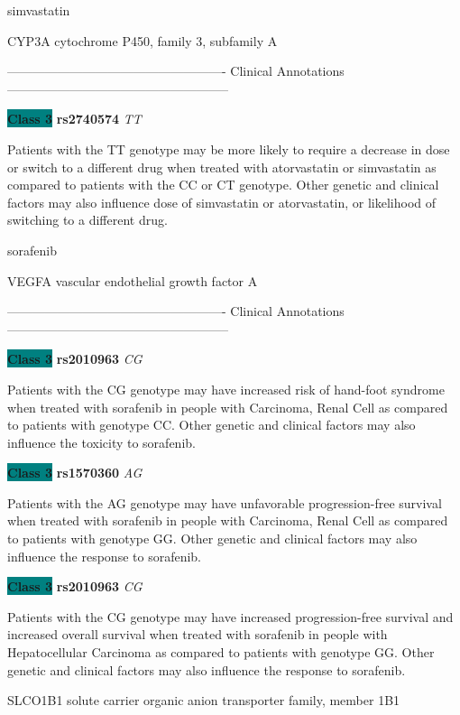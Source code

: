 \documentclass{resume} %
\begin{document}
\begin{rSection}{ simvastatin }
\begin{rSubsection}{ CYP3A }{ cytochrome P450, family 3, subfamily A }{}{}
\item[] ---------------------------------------------------- Clinical Annotations -----------------------------------------------------\newline
\item \textbf{\colorbox{teal} {Class 3}} \textbf{ rs2740574 } \textit{ TT }
\item[] Patients with the TT genotype may be more likely to require a decrease in dose or switch to a different drug when treated with atorvastatin or simvastatin as compared to patients with the CC or CT genotype. Other genetic and clinical factors may also influence dose of simvastatin or atorvastatin, or likelihood of switching to a different drug.
\end{rSubsection}

\end{rSection}\begin{rSection}{ sorafenib }
\item[]

\begin{rSubsection}{ VEGFA }{ vascular endothelial growth factor A }{}{}
\item[]

\item[] ---------------------------------------------------- Clinical Annotations -----------------------------------------------------\newline
\item \textbf{\colorbox{teal} {Class 3}} \textbf{ rs2010963 } \textit{ CG }
\item[] Patients with the CG genotype may have increased risk of hand-foot syndrome when treated with sorafenib in people with Carcinoma, Renal Cell as compared to patients with genotype CC. Other genetic and clinical factors may also influence the toxicity to sorafenib.\item \textbf{\colorbox{teal} {Class 3}} \textbf{ rs1570360 } \textit{ AG }
\item[] Patients with the AG genotype may have unfavorable progression-free survival when treated with sorafenib in people with Carcinoma, Renal Cell as compared to patients with genotype GG. Other genetic and clinical factors may also influence the response to sorafenib.\item \textbf{\colorbox{teal} {Class 3}} \textbf{ rs2010963 } \textit{ CG }
\item[] Patients with the CG genotype may have increased progression-free survival and increased overall survival when treated with sorafenib in people with Hepatocellular Carcinoma as compared to patients with genotype GG. Other genetic and clinical factors may also influence the response to sorafenib.
\end{rSubsection}\begin{rSubsection}{ SLCO1B1 }{ solute carrier organic anion transporter family, member 1B1 }{}{}
\item[]


\end{rSubsection}
\end{rSection}
\end{document}
